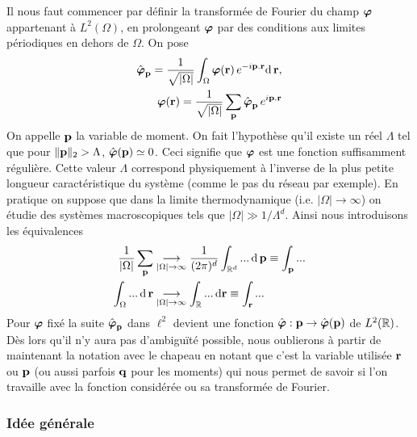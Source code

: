 \documentclass[10.5pt]{article}
\begin{document}
\begin{multicols*}{2}
Il nous faut commencer par définir la transformée de Fourier du champ $\boldsymbol{ \varphi}$ appartenant à $L^2(\Omega)$, en prolongeant $\boldsymbol{ \varphi}$ par des conditions aux limites périodiques en dehors de $\Omega$. On pose 
\begin{equation}
\begin{split}
\hat{\boldsymbol{ \varphi}}_{\bf p} = \frac{1}{\sqrt{|\Omega|}}\int_\Omega \boldsymbol{ \varphi}({\bf r}) \, e^{-i {\bf p} . {\bf r}} \text{d} \, {\bf r}, \\
\boldsymbol{ \varphi}({\bf r}) = \frac{1}{\sqrt{|\Omega|}}\sum_{\bf p} \hat{\boldsymbol{ \varphi}}_{\bf p} \, e^{i {\bf p}  .{\bf r}}
\end{split} 	
\end{equation}
On appelle ${\bf p}$ la variable de moment. On fait l'hypothèse qu'il existe un réel $\Lambda$ tel que pour $\|{\bf p}\|_{2} > \Lambda$, $\hat{\boldsymbol{ \varphi}}({\bf p}) \simeq 0$. Ceci signifie que $\boldsymbol{ \varphi}$ est une fonction suffisamment régulière. Cette valeur $\Lambda$ correspond physiquement à l'inverse de la plus petite longueur caractéristique du système (comme le pas du réseau par exemple). En pratique on suppose que dans la limite thermodynamique (i.e. $|\Omega| \to \infty$) on étudie des systèmes macroscopiques tels que $|\Omega|\gg 1/\Lambda^d$. Ainsi nous introduisons les équivalences 
\begin{equation}
\begin{split}
	\frac{1}{|\Omega|} \sum_{{\bf p}} & \underset{|\Omega| \to \infty}{\longrightarrow} \frac{1}{(2\pi)^d} \int_{\mathbb{R}^d} ... \, \text{d} \, {\bf p}  \equiv \int_{\bf p} ... \\
	\int_\Omega	... \, \text{d} \, {\bf r} & \underset{|\Omega| \to \infty}{\longrightarrow} \int_{\mathbb{R}} ... \, \text{d} {\bf r} \equiv \int_{\bf r} ...
\end{split}
\end{equation}
Pour $\boldsymbol{ \varphi}$ fixé la suite $\hat{\boldsymbol{ \varphi}}_{\bf p}$ dans $\ell^2$ devient une fonction $\hat{\boldsymbol{ \varphi}} : {\bf p} \rightarrow \hat{\boldsymbol{ \varphi}}({\bf p})$ de $L^2(\mathbb{R})$. 
Dès lors qu'il n'y aura pas d'ambiguïté possible, nous oublierons à partir de maintenant la notation avec le chapeau en notant que c'est la variable utilisée ${\bf r}$ ou ${\bf p}$ (ou aussi parfois ${\bf q}$ pour les moments) qui nous permet de savoir si l'on travaille avec la fonction considérée ou sa transformée de Fourier. \\


\subsubsection{Idée générale}

\label{sec:RG}


\end{multicols*}
\end{document}
